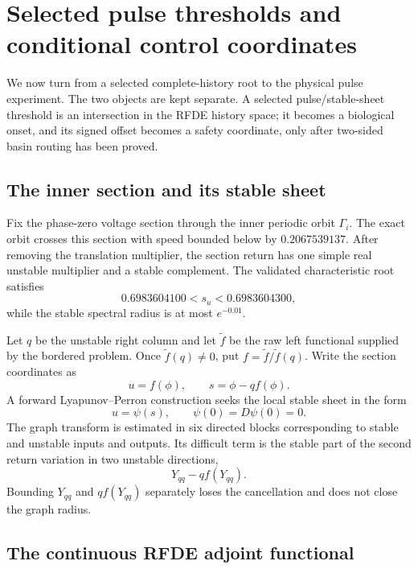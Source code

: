 \section{Selected pulse thresholds and conditional control coordinates}
\label{sec:pulse-control}

We now turn from a selected complete-history root to the physical pulse
experiment.  The two objects are kept separate.  A selected
pulse/stable-sheet threshold is an intersection in the RFDE history space;
it becomes a biological onset, and its signed offset becomes a safety
coordinate, only after two-sided basin routing has been proved.

\subsection{The inner section and its stable sheet}

Fix the phase-zero voltage section through the inner periodic orbit
\(\Gamma_i\).  The exact orbit crosses this section with speed bounded below
by \(0.2067539137\).  After removing the translation multiplier, the
section return has one simple real unstable multiplier and a stable
complement.  The validated characteristic root satisfies
\begin{equation}
 0.6983604100<s_u<0.6983604300,                         \label{eq:inner-unstable-root}
\end{equation}
while the stable spectral radius is at most \(e^{-0.01}\).

Let \(q\) be the unstable right column and let \(\widetilde f\) be the raw
left functional supplied by the bordered problem.  Once
\(\widetilde f(q)\ne0\), put
\(f=\widetilde f/\widetilde f(q)\).  Write the section coordinates as
\[
 u=f(\phi),\qquad s=\phi-qf(\phi).
\]
A forward Lyapunov--Perron construction seeks the local stable sheet in the
form
\begin{equation}
 u=\psi(s),\qquad \psi(0)=D\psi(0)=0.                  \label{eq:stable-graph}
\end{equation}
The graph transform is estimated in six directed blocks corresponding to
stable and unstable inputs and outputs.  Its difficult term is the stable
part of the second return variation in two unstable directions,
\[
 Y_{qq}-qf(Y_{qq}).
\]
Bounding \(Y_{qq}\) and \(qf(Y_{qq})\) separately loses the cancellation and
does not close the graph radius.

\subsection{The continuous RFDE adjoint functional}

